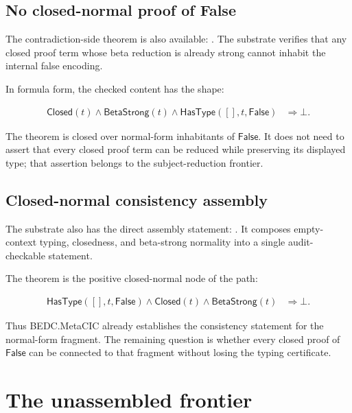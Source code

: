 \subsection{No closed-normal proof of False}
\label{subsec:closed-metacic-consistency-assembly-no-normal-false}

The contradiction-side theorem is also available:
. The substrate
verifies that any closed proof term whose beta reduction is already strong
cannot inhabit the internal false encoding.

In formula form, the checked content has the shape:

$$
\begin{aligned}
  \mathsf{Closed}(t)
  \wedge
  \mathsf{BetaStrong}(t)
  \wedge
  \mathsf{HasType}([],t,\mathsf{False})
  &\Rightarrow
  \bot.
\end{aligned}
$$

The theorem is closed over normal-form inhabitants of $\mathsf{False}$. It does
not need to assert that every closed proof term can be reduced while preserving
its displayed type; that assertion belongs to the subject-reduction frontier.

\subsection{Closed-normal consistency assembly}
\label{subsec:closed-metacic-consistency-assembly-normal-assembly}

The substrate also has the direct assembly statement:
. It composes
empty-context typing, closedness, and beta-strong normality into a single
audit-checkable statement.

The theorem is the positive closed-normal node of the path:

$$
\begin{aligned}
  \mathsf{HasType}([],t,\mathsf{False})
  \wedge
  \mathsf{Closed}(t)
  \wedge
  \mathsf{BetaStrong}(t)
  &\Rightarrow
  \bot.
\end{aligned}
$$

Thus BEDC.MetaCIC already establishes the consistency statement for the
normal-form fragment. The remaining question is whether every closed proof of
$\mathsf{False}$ can be connected to that fragment without losing the typing
certificate.

\section{The unassembled frontier}
\label{sec:closed-metacic-consistency-assembly-frontier}

